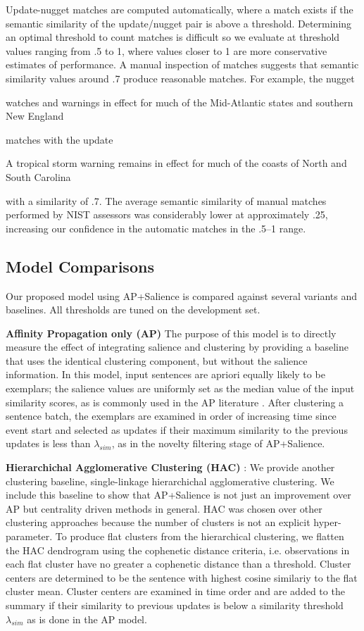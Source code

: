 Update-nugget matches are computed automatically, where a
match exists if the semantic similarity of the update/nugget pair is above 
a threshold.
Determining an optimal threshold to count matches is difficult so 
we evaluate at 
threshold values ranging
from .5 to 1, where values closer to 1 are more conservative estimates of
performance.
A manual inspection of matches 
suggests that semantic similarity values around .7 produce reasonable matches.
For example, the nugget 
\begin{blockquote}
watches and warnings in effect for much of the Mid-Atlantic states and 
southern New England 
\end{blockquote}
\noindent
matches with the update 
\begin{blockquote}
A tropical storm warning remains in effect for much of the coasts 
of North and South Carolina\end{blockquote}
\noindent
with a similarity of .7. 
The average semantic similarity of manual matches performed 
by NIST assessors was considerably lower at approximately .25, increasing
our confidence in the automatic matches in the .5--1 range.


\subsection{Model Comparisons}

Our proposed model using AP+Salience is compared against several variants and baselines. All thresholds
are tuned on the development set.

\textbf{Affinity Propagation only (AP) } The purpose of this model
is to directly measure the effect of integrating salience and clustering by providing a baseline that uses the identical 
clustering component, but without the salience information.
In this model, input sentences are apriori equally likely to be exemplars;
the salience values are uniformly set as the median value of the 
input similarity scores, as is commonly used in the AP literature \cite{?}.
After clustering a sentence batch, the exemplars are examined in order
of increasing time since event start and selected as updates if their
maximum similarity to the previous updates is less than $\lambda_{sim}$,
as in the novelty filtering stage of AP+Salience.

\textbf{Hierarchichal Agglomerative Clustering (HAC)} : We provide another clustering baseline, single-linkage hierarchichal agglomerative clustering.
We include this baseline to show that AP+Salience is not just an improvement
over AP but centrality driven methods in general.
HAC was chosen over other clustering approaches because the number of clusters 
is not an explicit hyper-parameter. To produce flat clusters from the hierarchical clustering, we flatten the HAC dendrogram
using the cophenetic distance criteria, i.e. observations in each flat cluster have no greater a cophenetic distance than a threshold.
Cluster centers are determined to be the sentence with highest cosine similariy to the flat cluster mean.
Cluster centers are examined in time order and are added to the summary if their similarity to previous updates is below a similarity threshold $\lambda_{sim}$ as is done in the AP model.

